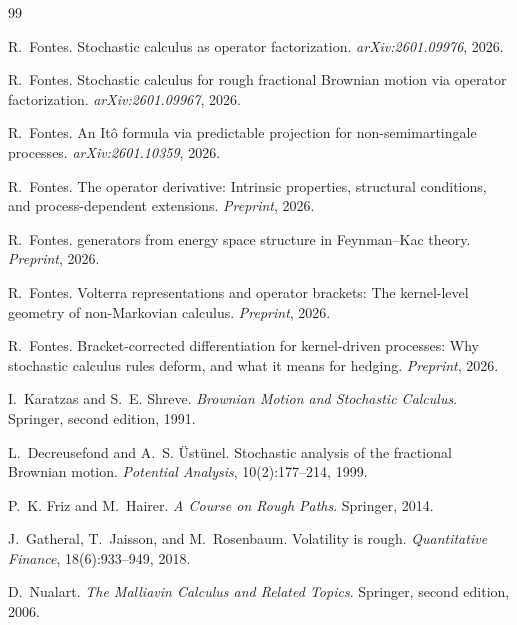 \documentclass[11pt]{article}
\theoremstyle{plain}
\theoremstyle{definition}
\theoremstyle{remark}
\begin{document}
\begin{thebibliography}{99}

R.~Fontes.
\newblock Stochastic calculus as operator factorization.
\newblock \emph{arXiv:2601.09976}, 2026.

R.~Fontes.
\newblock Stochastic calculus for rough fractional {B}rownian motion via
operator factorization.
\newblock \emph{arXiv:2601.09967}, 2026.

R.~Fontes.
\newblock An {I}t\^o formula via predictable projection for non-semimartingale
processes.
\newblock \emph{arXiv:2601.10359}, 2026.

R.~Fontes.
\newblock The operator derivative: Intrinsic properties, structural conditions,
and process-dependent extensions.
\newblock \emph{Preprint}, 2026.

R.~Fontes.
 generators from energy space structure in {F}eynman--{K}ac theory.
\newblock \emph{Preprint}, 2026.

R.~Fontes.
\newblock Volterra representations and operator brackets: The kernel-level
geometry of non-{M}arkovian calculus.
\newblock \emph{Preprint}, 2026.

R.~Fontes.
\newblock Bracket-corrected differentiation for kernel-driven processes:
Why stochastic calculus rules deform, and what it means for hedging.
\newblock \emph{Preprint}, 2026.

I.~Karatzas and S.~E. Shreve.
\newblock \emph{Brownian Motion and Stochastic Calculus}.
\newblock Springer, second edition, 1991.

L.~Decreusefond and A.~S. \"Ust\"unel.
\newblock Stochastic analysis of the fractional {B}rownian motion.
\newblock \emph{Potential Analysis}, 10(2):177--214, 1999.

P.~K. Friz and M.~Hairer.
\newblock \emph{A Course on Rough Paths}.
\newblock Springer, 2014.

J.~Gatheral, T.~Jaisson, and M.~Rosenbaum.
\newblock Volatility is rough.
\newblock \emph{Quantitative Finance}, 18(6):933--949, 2018.

D.~Nualart.
\newblock \emph{The {M}alliavin Calculus and Related Topics}.
\newblock Springer, second edition, 2006.

\end{thebibliography}
\end{document}
